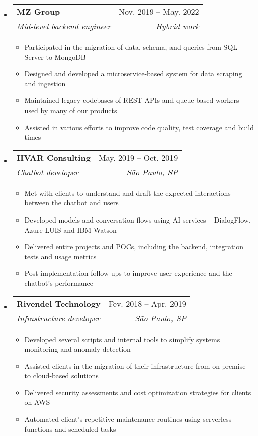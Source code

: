\documentclass[letterpaper,12pt]{article}[leftmargin=*]
\makeatletter
\def \entryspacing {-0pt}
\newcommand{\resumeEntryStart}{\begin{itemize}[leftmargin=2.5mm]}
\newcommand{\resumeEntryEnd}{\end{itemize}\vspace{\entryspacing}}
\newcommand{\resumeItemListStart}{\begin{itemize}[leftmargin=4.5mm]}
\newcommand{\resumeItemListEnd}{\end{itemize}}
\newcommand{\resumeItem}[1]{
  \item\small{
    {#1 \vspace{-2pt}}
  }
}
\newcommand{\resumeEntryTSDL}[4]{
  \vspace{-1pt}\item[]
    \begin{tabularx}{0.97\textwidth}{X@{\hspace{60pt}}r}
      \textbf{\color{primary}#1} & {\firabook\color{accent}\small#2} \\
      \textit{\color{accent}\small#3} & \textit{\color{accent}\small#4} \\
    \end{tabularx}\vspace{-6pt}
}
\makeatother
\begin{document}
  \resumeEntryStart
    \resumeEntryTSDL
      {MZ Group}{Nov. 2019 -- May. 2022}
      {Mid-level backend engineer}{Hybrid work}
    \resumeItemListStart
      \resumeItem {Participated in the migration of data, schema, and queries from SQL Server to MongoDB}
      \resumeItem {Designed and developed a microservice-based system for data scraping and ingestion}
      \resumeItem {Maintained legacy codebases of REST APIs and queue-based workers used by many of our products}
      \resumeItem {Assisted in various efforts to improve code quality, test coverage and build times}
    \resumeItemListEnd
  \resumeEntryEnd

  \resumeEntryStart
    \resumeEntryTSDL
      {HVAR Consulting}{May. 2019 -- Oct. 2019}
      {Chatbot developer}{São Paulo, SP}
    \resumeItemListStart
        \resumeItem {Met with clients to understand and draft the expected interactions between the chatbot and users}
        \resumeItem {Developed models and conversation flows using AI services -- DialogFlow, Azure LUIS and IBM Watson}
        \resumeItem {Delivered entire projects and POCs, including the backend, integration tests and usage metrics}
        \resumeItem {Post-implementation follow-ups to improve user experience and the chatbot's performance}
    \resumeItemListEnd
  \resumeEntryEnd

  \resumeEntryStart
    \resumeEntryTSDL
      {Rivendel Technology}{Fev. 2018 -- Apr. 2019}
      {Infrastructure developer}{São Paulo, SP}
    \resumeItemListStart
      \resumeItem {Developed several scripts and internal tools to simplify systems monitoring and anomaly detection}
      \resumeItem {Assisted clients in the migration of their infrastructure from on-premise to cloud-based solutions}
      \resumeItem {Delivered security assessments and cost optimization strategies for clients on AWS}
      \resumeItem {Automated client's repetitive maintenance routines using serverless functions and scheduled tasks}
    \resumeItemListEnd
  \resumeEntryEnd
\end{document}
